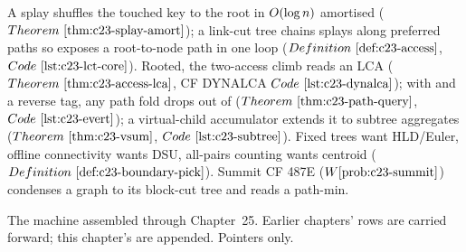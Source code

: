 \begin{recallbox}
A splay shuffles the touched key to the root in \(O(\log n)\) amortised (\(\thmref{c23-splay-amort}\));
a link-cut tree chains splays along preferred paths so  exposes a root-to-node path in
one loop (\(\defref{c23-access}\), \(\coderef{c23-lct-core}\)). Rooted, the two-access climb reads an
LCA (\(\thmref{c23-access-lca}\), CF DYNALCA \(\coderef{c23-dynalca}\)); with  and a
reverse tag, any path fold drops out of  (\(\thmref{c23-path-query}\),
\(\coderef{c23-evert}\)); a virtual-child accumulator extends it to subtree aggregates
(\(\thmref{c23-vsum}\), \(\coderef{c23-subtree}\)). Fixed trees want HLD/Euler, offline connectivity
wants DSU, all-pairs counting wants centroid (\(\defref{c23-boundary-pick}\)). Summit CF 487E
(\(\probref{c23-summit}\)) condenses a graph to its block-cut tree and reads a path-min.
\end{recallbox}



The machine assembled through Chapter~25. Earlier chapters' rows are carried forward; this
chapter's are appended. Pointers only.

